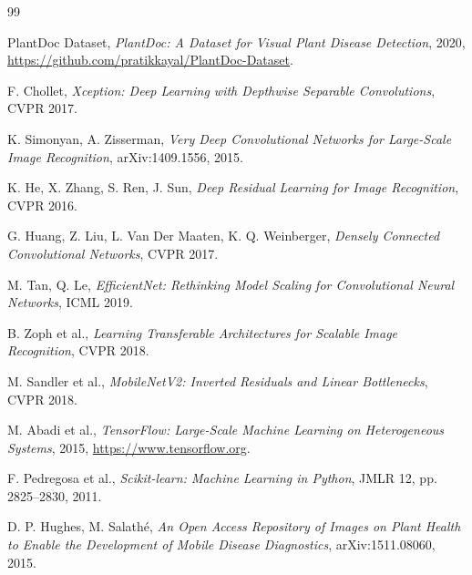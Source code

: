 \documentclass[12pt, a4paper]{report}
\begin{document}
\newpage
\begin{thebibliography}{99}

PlantDoc Dataset, \textit{PlantDoc: A Dataset for Visual Plant Disease Detection}, 2020, \url{https://github.com/pratikkayal/PlantDoc-Dataset}.

F. Chollet, \textit{Xception: Deep Learning with Depthwise Separable Convolutions}, CVPR 2017.

K. Simonyan, A. Zisserman, \textit{Very Deep Convolutional Networks for Large-Scale Image Recognition}, arXiv:1409.1556, 2015.

K. He, X. Zhang, S. Ren, J. Sun, \textit{Deep Residual Learning for Image Recognition}, CVPR 2016.

G. Huang, Z. Liu, L. Van Der Maaten, K. Q. Weinberger, \textit{Densely Connected Convolutional Networks}, CVPR 2017.

M. Tan, Q. Le, \textit{EfficientNet: Rethinking Model Scaling for Convolutional Neural Networks}, ICML 2019.

B. Zoph et al., \textit{Learning Transferable Architectures for Scalable Image Recognition}, CVPR 2018.

M. Sandler et al., \textit{MobileNetV2: Inverted Residuals and Linear Bottlenecks}, CVPR 2018.

M. Abadi et al., \textit{TensorFlow: Large-Scale Machine Learning on Heterogeneous Systems}, 2015, \url{https://www.tensorflow.org}.

F. Pedregosa et al., \textit{Scikit-learn: Machine Learning in Python}, JMLR 12, pp. 2825–2830, 2011.

D. P. Hughes, M. Salathé, \textit{An Open Access Repository of Images on Plant Health to Enable the Development of Mobile Disease Diagnostics}, arXiv:1511.08060, 2015.

\end{thebibliography}
\end{document}
